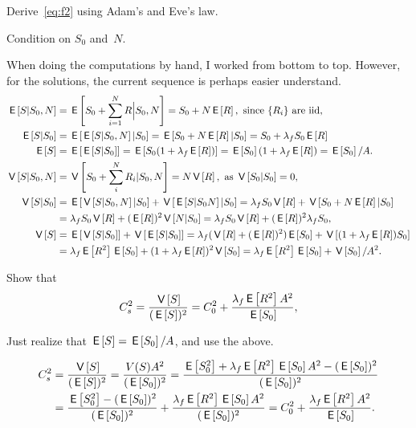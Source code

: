 \documentclass[stochastic-or.tex]{subfiles}
\begin{document}
\begin{exercise}\label{ex:f-4}
Derive~\cref{eq:f2} using  Adam's and Eve's law.
\begin{hint}
Condition on $S_0$ and~$N$.
\end{hint}
\begin{solution}
When doing the computations by hand, I worked from bottom to top. However, for the solutions, the current sequence is perhaps easier understand.
\begin{align*}
  \E{S|S_0, N} &=\E{S_0 + \sum_{i=1}^N R \Big|S_0, N} = S_0 + N \E R, \text{ since $\{R_i\}$ are iid},\\
  \E{S|S_0} &= \E{\E{S|S_{0}, N}|S_0} = \E{S_0 + N \E R |S_{0}} = S_0 + \lambda_f S_0 \E R\\
  \E{S} &= \E{\E{S|S_{0}}} = \E{S_0(1+\lambda_f  \E R)} = \E{S_0}(1 + \lambda_f \E R) = \E{S_0}/A.\\
  \V{S|S_0, N} &=  \V{S_0 + \sum_i^N R_i| S_{0}, N} = N \V R, \text{ as } \V{S_0|S_0} = 0,\\
\V{S|S_0} &= \E{\V{S|S_0, N} |S_0} + \V{\E{S|S_{0}N}|S_{0}} = \lambda_f S_0 \V R + \V{S_{0} + N \E R|S_0}\\
  &= \lambda_f S_0\V R + (\E R)^{2} \V{N|S_0} = \lambda_f S_0\V R + (\E R)^{2} \lambda_{f} S_{0}, \\
  \V S &= \E{\V{S|S_0}} + \V{\E{S|S_0}} = \lambda_f (\V R + (\E R)^2) \E{S_0} + \V{(1+\lambda_f \E R)S_{0}} \\
  &= \lambda_f \E{R^2} \E{S_0} + (1+\lambda_f \E R)^2 \V{S_{0}} = \lambda_f \E{R^2} \E{S_0} + \V{S_{0}}/A^{2}.
\end{align*}

\end{solution}
\end{exercise}


\begin{exercise}\label{ex:l-160}
Show that
 \begin{equation*}
 C_s^2 = \frac{\V{S}}{(\E S)^2} = C_0^2 + \frac{\lambda_f \E{R^2} A^2}{\E{S_0}},
 \end{equation*}
\begin{hint} Just realize that $\E{S} = \E{S_0}/A$, and use the above.
\end{hint}
\begin{solution}
 \begin{align*}
C_s^2 &= \frac{\V{S}}{(\E S)^2} =\frac{V(S) A^2}{(\E{S_0})^2}
=\frac{\E{S_0^2} + \lambda_f \E{R^2} \E{S_0}A^2 -(\E{S_0})^2}{(\E{S_0})^2} \\
&=\frac{\E{S_0^2} -(\E{S_0})^2}{(\E{S_0})^2} + \frac{\lambda_f \E{R^2} \E{S_0}A^2}{(\E{S_0})^2}
=C_0^2 + \frac{\lambda_f \E{R^2}A^2}{\E{S_0}}.
 \end{align*}
\end{solution}
\end{exercise}
\end{document}
